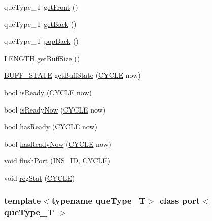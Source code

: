 \begin{DoxyCompactItemize}
\item 
queType\_\-T \hyperlink{classport_afe64047b4e7df87d4a031097ea159852}{getFront} ()
\item 
queType\_\-T \hyperlink{classport_a53d30f96ac41c4f3a60174cd66b1656e}{getBack} ()
\item 
queType\_\-T \hyperlink{classport_aa102d5f7c3e925382f62a37d220888ff}{popBack} ()
\item 
\hyperlink{global_2global_8h_ad7ec63c69447a2b630929c8e0197860d}{LENGTH} \hyperlink{classport_a7276424a4d3b305c198159f2ed6b7dab}{getBuffSize} ()
\item 
\hyperlink{global_2global_8h_a8bd4ea2582a6025c1cfe99bf9947489c}{BUFF\_\-STATE} \hyperlink{classport_abf9be02812c2503eee69704a01b14145}{getBuffState} (\hyperlink{global_2global_8h_a7e19a550ec11d1ed921deb20c22efb5b}{CYCLE} now)
\item 
bool \hyperlink{classport_a57a6cc5a8388feaf7fd09bd9616f0ee7}{isReady} (\hyperlink{global_2global_8h_a7e19a550ec11d1ed921deb20c22efb5b}{CYCLE} now)
\item 
bool \hyperlink{classport_ae59766c24fe4a05ba31cc6d2dc2eff42}{isReadyNow} (\hyperlink{global_2global_8h_a7e19a550ec11d1ed921deb20c22efb5b}{CYCLE} now)
\item 
bool \hyperlink{classport_a8930ed8cec58814709f4515a33d62141}{hasReady} (\hyperlink{global_2global_8h_a7e19a550ec11d1ed921deb20c22efb5b}{CYCLE} now)
\item 
bool \hyperlink{classport_af03e53249eff9bb17c76531d3a72880f}{hasReadyNow} (\hyperlink{global_2global_8h_a7e19a550ec11d1ed921deb20c22efb5b}{CYCLE} now)
\item 
void \hyperlink{classport_a58991733cd9bb95beb7303826b9b3d3f}{flushPort} (\hyperlink{global_2global_8h_a1883c47d0023d0f200e1d86eced6a070}{INS\_\-ID}, \hyperlink{global_2global_8h_a7e19a550ec11d1ed921deb20c22efb5b}{CYCLE})
\item 
void \hyperlink{classport_a966cfeb3b369ec22e8081275481abe32}{regStat} (\hyperlink{global_2global_8h_a7e19a550ec11d1ed921deb20c22efb5b}{CYCLE})
\end{DoxyCompactItemize}
\subsubsection*{template$<$typename queType\_\-T$>$ class port$<$ queType\_\-T $>$}



